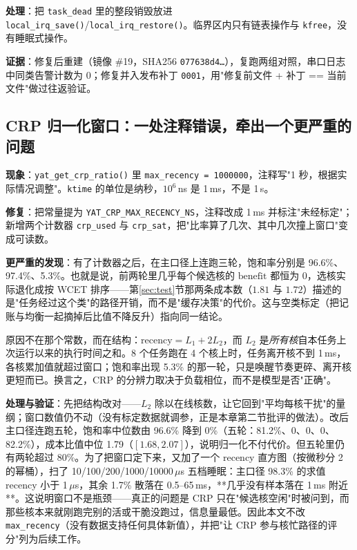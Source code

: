 \textbf{处理}：把 \texttt{task\_dead} 里的整段销毁放进 \texttt{local\_irq\_save()}/\texttt{local\_irq\_restore()}。临界区内只有链表操作与 \texttt{kfree}，没有睡眠式操作。

\textbf{证据}：修复后重建（镜像 \#19，SHA256 \texttt{077638d4\ldots}），复跑两组对照，串口日志中同类告警计数为 0；修复并入发布补丁 \texttt{0001}，用"修复前文件 + 补丁 == 当前文件"做过往返验证。

\subsection{CRP 归一化窗口：一处注释错误，牵出一个更严重的问题}

\textbf{现象}：\texttt{yat\_get\_crp\_ratio()} 里 \texttt{max\_recency = 1000000}，注释写"1 秒，根据实际情况调整"。\texttt{ktime} 的单位是纳秒，$10^6$\,ns 是 1\,ms，不是 1\,s。

\textbf{修复}：把常量提为 \texttt{YAT\_CRP\_MAX\_RECENCY\_NS}，注释改成 1\,ms 并标注"未经标定"；新增两个计数器 \texttt{crp\_used} 与 \texttt{crp\_sat}，把"比率算了几次、其中几次撞上窗口"变成可读数。

\textbf{更严重的发现}：有了计数器之后，在主口径上连跑三轮，饱和率分别是 96.6\%、97.4\%、5.3\%。也就是说，前两轮里几乎每个候选核的 $\mathrm{benefit}$ 都恒为 0，选核实际退化成按 WCET 排序——第\ref{sec:test}节那两条成本数（$1.81$ 与 $1.72$）描述的是"任务经过这个类"的路径开销，而不是"缓存决策"的代价。这与空类标定（把记账与均衡一起摘掉后比值不降反升）指向同一结论。

原因不在那个常数，而在结构：$\mathrm{recency}=L_1+2L_2$，而 $L_2$ 是\emph{所有核}自本任务上次运行以来的执行时间之和。8 个任务跑在 4 个核上时，任务离开核不到 1\,ms，各核累加值就超过窗口；饱和率出现 5.3\% 的那一轮，只是唤醒节奏更碎、离开核更短而已。换言之，CRP 的分辨力取决于负载相位，而不是模型是否"正确"。

\textbf{处理与验证}：先把结构改对——$L_2$ 除以在线核数，让它回到"平均每核干扰"的量纲；窗口数值仍不动（没有标定数据就调参，正是本章第二节批评的做法）。改后主口径连跑五轮，饱和率中位数由 96.6\% 降到 0\%（五轮：81.2\%、0、0、0、82.2\%），成本比值中位 1.79（$[1.68, 2.07]$），说明归一化不付代价。但五轮里仍有两轮超过 80\%。为了把窗口定下来，又加了一个 recency 直方图（按微秒分 2 的幂桶），扫了 10/100/200/1000/10000\,$\mu$s 五档睡眠：主口径 98.3\% 的求值 recency 小于 1\,$\mu$s，其余 1.7\% 散落在 0.5--65\,ms，**几乎没有样本落在 1\,ms 附近**。这说明窗口不是瓶颈——真正的问题是 CRP 只在"候选核空闲"时被问到，而那些核本来就刚跑完别的活或干脆没跑过，信息量最低。因此本文不改 \texttt{max\_recency}（没有数据支持任何具体新值），并把"让 CRP 参与核忙路径的评分"列为后续工作。


